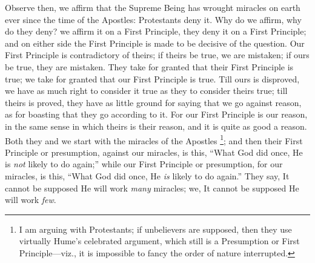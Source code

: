 Observe then, we affirm that the Supreme Being has
wrought miracles on earth ever since the time of the
Apostles: Protestants deny it. Why do we affirm, why do
they deny? we affirm it on a First Principle, they deny
it on a First Principle; and on either side the First
Principle is made to be decisive of the question. Our
First Principle is contradictory of theirs; if theirs be
true, we are mistaken; if ours be true, they are
mistaken. They take for granted that their First
Principle is true; we take for granted that our First
Principle is true. Till ours is disproved, we have as
much right to consider it true as they to consider theirs
true; till theirs is proved, they have as little ground
for saying that we go against reason, as for boasting
that they go according to it. For our First Principle is
our reason, in the same sense in which theirs is their
reason, and it is quite as good a reason. Both they and
we start with the miracles of the Apostles \footnote{I am arguing with Protestants;
if unbelievers are supposed, then they use virtually
Hume's celebrated argument, which still is a Presumption
or First Principle—viz., it is impossible to fancy
the order of nature interrupted.}; and then
their First Principle or presumption, against our
miracles, is this, ``What God did once, He is \emph{not}
likely to do again;'' while our First Principle or
presumption, for our miracles, is this, ``What God
did once, He \emph{is} likely to do again.'' They
say, It cannot be supposed He will work \emph{many}
miracles; we, It cannot be supposed He will work \emph{few}.

